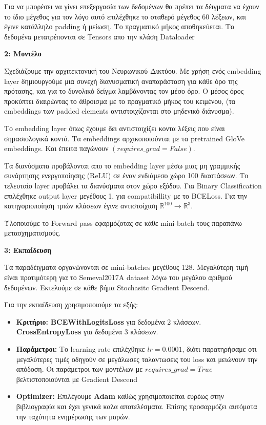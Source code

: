 \documentclass[12pt]{article}
\begin{document}
Για να μπορέσει να γίνει επεξεργασία των δεδομένων θα πρέπει τα δέιγματα να έχουν το ίδιο μέγεθος για τον λόγο αυτό επιλέχθηκε το σταθερό μέγεθος 60 λέξεων, και έγινε κατάλληλο padding ή μείωση. Το πραγματικό μήκος αποθηκεύεται. Τα δεδομένα μετατρέπονται σε Tensors απο την κλάση Dataloader

\textbf{2: Μοντέλο}

Σχεδιάζουμε την αρχιτεκτονική του Νευρωνικού Δικτύου. Με χρήση ενός embedding layer δημιουργούμε μια συνεχή διανυσματική αναπαράσταση για κάθε όρο της πρότασης, και για το δυνολικό δείγμα λαμβάνοντας τον μέσο όρο. Ο μέσος όρος προκύπτει διαιρώντας το άθροισμα με το πραγματικό μήκος του κειμένου, (τα embeddings των padded elements αντιστοιχίζονται στο μηδενικό διάνυσμα).

Το embedding layer όπως έχουμε δει αντιστοιχίζει κοντα λέξεις που είναι σημασιολογικά κοντά. Τα embeddings αρχικοποιούνται με τα pretrained GloVe embeddings. Και έπειτα παγώνουν $(requires\_grad=False)$.

Τα διανύσματα προβάλονται απο το embedding layer μέσω μιας μη γραμμικής συνάρτησης ενεργοποίησης (ReLU) σε έναν ενδιάμεσο χώρο 100 διαστάσεων. Το τελευταίο layer προβάλει τα διανύσματα στον χώρο εξόδου. Για Binary Classification επιλέχθηκε output layer μεγέθους 1, για compatibillity με το BCELoss. Για την κατηγοριοποίηση τριών κλάσεων έγινε αντιστοίχιση $\mathbb{R}^{100} \rightarrow \mathbb{R}^3$.

Υλοποιούμε το Forward pass εφαρμόζοτας σε κάθε mini-batch τους παραπάνω μετασχηματισμούς. 

\textbf{3: Εκπαίδευση}

Τα παραδέιγματα οργανώνονται σε mini-batches μεγέθους 128. Μεγαλύτερη τιμή είναι προτιμότερη για το Semeval2017A dataset λόγω του μεγάλου αριθμού δεδομένων. Εκτελούμε σε κάθε βήμα Stochasitc Gradient Descend. 

Για την εκπαίδευση χρησιμοποιούμε τα εξής:

\begin{itemize}
    \item \textbf{Κριτήριο:} \textbf{BCEWithLogitsLoss} για δεδομένα 2 κλάσεων. \textbf{CrossEntropyLoss} για δεδομένα 3 κλάσεων. 
    \item \textbf{Παράμετροι:} Το learning rate επιλέχθηκε $lr = 0.0001$, διότι παρατηρήσαμε οτι μεγαλύτερες τιμές οδηγούν σε μεγάλωσες ταλαντωσεις του loss και μειώνουν την απόδοση. Οι παράμετροι των μοντέλων με $requires\_grad=True$ βελτιστοποιούνται με Gradient Descend
    \item \textbf{Optimizer:} Επιλέγουμε \textbf{Adam} καθώς χρησιμοποιείται ευρέως στην βιβλιογραφία και έχει γενικά καλα αποτελέσματα. Επίσης προσαρμόζει αυτόματα την ταχύτητα ενημέρωσης των μαρών.
\end{itemize}
\end{document}
